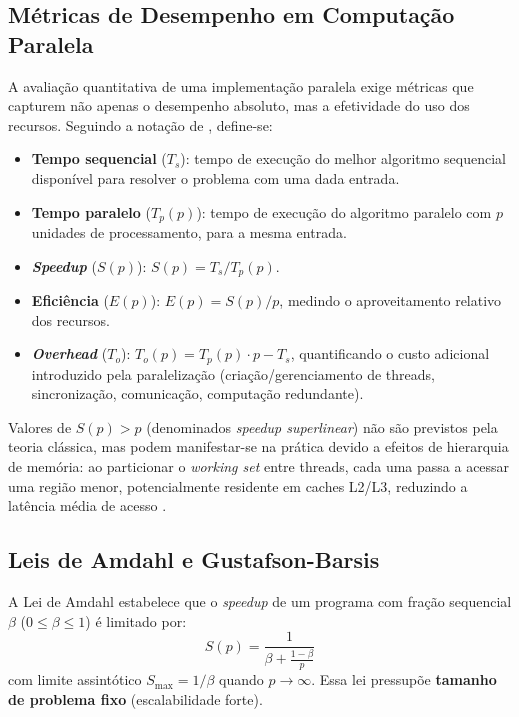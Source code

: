 \documentclass[12pt]{article}
\begin{document}
\subsection{Métricas de Desempenho em Computação Paralela}

A avaliação quantitativa de uma implementação paralela exige métricas que capturem não apenas o desempenho absoluto, mas a efetividade do uso dos recursos. Seguindo a notação de \cite{eijkhout2022arthpc1}, define-se:

\begin{itemize}
	\item \textbf{Tempo sequencial} ($T_s$): tempo de execução do melhor algoritmo sequencial disponível para resolver o problema com uma dada entrada.
	\item \textbf{Tempo paralelo} ($T_p(p)$): tempo de execução do algoritmo paralelo com $p$ unidades de processamento, para a mesma entrada.
	\item \textbf{\textit{Speedup}} ($S(p)$): $S(p) = T_s / T_p(p)$.
	\item \textbf{Eficiência} ($E(p)$): $E(p) = S(p) / p$, medindo o aproveitamento relativo dos recursos.
	\item \textbf{\textit{Overhead}} ($T_o$): $T_o(p) = T_p(p) \cdot p - T_s$, quantificando o custo adicional introduzido pela paralelização (criação/gerenciamento de threads, sincronização, comunicação, computação redundante).
\end{itemize}

Valores de $S(p) > p$ (denominados \textit{speedup superlinear}) não são previstos pela teoria clássica, mas podem manifestar-se na prática devido a efeitos de hierarquia de memória: ao particionar o \textit{working set} entre threads, cada uma passa a acessar uma região menor, potencialmente residente em caches L2/L3, reduzindo a latência média de acesso \cite{eijkhout2022arthpc1}.

\subsection{Leis de Amdahl e Gustafson-Barsis}

A Lei de Amdahl \cite{eijkhout2022arthpc1} estabelece que o \textit{speedup} de um programa com fração sequencial $\beta$ ($0 \le \beta \le 1$) é limitado por:
\begin{equation}
	S(p) = \frac{1}{\beta + \frac{1 - \beta}{p}}
\end{equation}
com limite assintótico $S_{\max} = 1/\beta$ quando $p \to \infty$. Essa lei pressupõe \textbf{tamanho de problema fixo} (escalabilidade forte).
\end{document}
